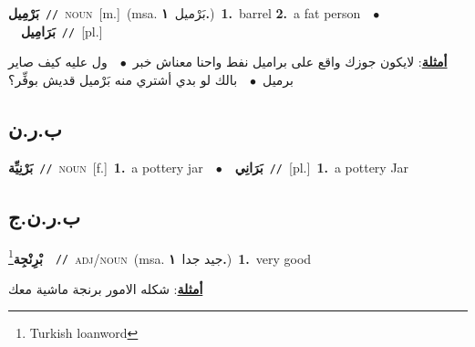 \documentclass[10pt,a4paper,twoside]{article} %
\begin{document}
\begin{multicols}{2}
{\setlength\topsep{0pt}\textbf{\foreignlanguage{arabic}{بَرْمِيل}}\ {\color{gray}\texttt{//}\color{black}}\ \textsc{noun}\ [m.]\ \color{gray}(msa. \foreignlanguage{arabic}{بَرْميل}~\foreignlanguage{arabic}{\textbf{١.}})\color{black}\ \textbf{1.}~barrel  \textbf{2.}~a fat person\ \ $\bullet$\ \ \setlength\topsep{0pt}\textbf{\foreignlanguage{arabic}{بَرَامِيل}}\ {\color{gray}\texttt{//}\color{black}}\ [pl.]\  \begin{flushright}\color{gray}\foreignlanguage{arabic}{\textbf{\underline{\foreignlanguage{arabic}{أمثلة}}}: لايكون جوزك واقع على براميل نفط واحنا معناش خبر\ $\bullet$\ \  ول عليه كيف صاير برميل\ $\bullet$\ \  بالك لو بدي أشتري منه بَرْميل قديش بوفِّر؟}\end{flushright}\color{black}} \vspace{2mm}

\vspace{-3mm}
\subsection*{\color{blue}\foreignlanguage{arabic}{ب.ر.ن}\color{blue}{}} 

{\setlength\topsep{0pt}\textbf{\foreignlanguage{arabic}{بَرْنِيِّة}}\ {\color{gray}\texttt{//}\color{black}}\ \textsc{noun}\ [f.]\ \textbf{1.}~a pottery jar\ \ $\bullet$\ \ \setlength\topsep{0pt}\textbf{\foreignlanguage{arabic}{بَرَانِي}}\ {\color{gray}\texttt{//}\color{black}}\ [pl.]\ \textbf{1.}~a pottery Jar\ } \vspace{2mm}

\vspace{-3mm}
\subsection*{\color{blue}\foreignlanguage{arabic}{ب.ر.ن.ج}\color{blue}{ (ntws)}} 

{\setlength\topsep{0pt}\textbf{\foreignlanguage{arabic}{بْرِنْجِة}}\footnote{Turkish loanword}\ \ {\color{gray}\texttt{//}\color{black}}\ \textsc{adj/noun}\ \color{gray}(msa. \foreignlanguage{arabic}{جيد جدا}~\foreignlanguage{arabic}{\textbf{١.}})\color{black}\ \textbf{1.}~very good\  \begin{flushright}\color{gray}\foreignlanguage{arabic}{\textbf{\underline{\foreignlanguage{arabic}{أمثلة}}}: شكله الامور برنجة ماشية معك}\end{flushright}\color{black}} \vspace{2mm}


\end{multicols}
\end{document}
